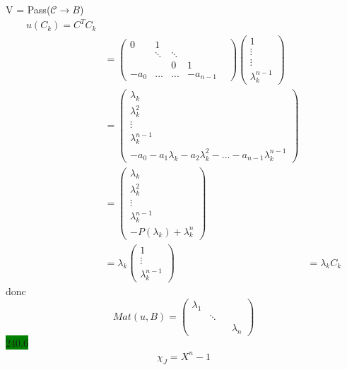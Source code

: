 \documentclass{article}
\begin{document}
V = Pass(\(\mathcal{C}\to B\))\begin{align*}
    u(C_k) = C^T C_k \\
    &= \begin{pmatrix}
        0 & 1 & & \\
        & \ddots & \ddots & & \\
        & & 0 & 1 \\
        -a_0&... & ...&-a_{n-1}
    \end{pmatrix}\begin{pmatrix}
        1 \\ \vdots \\ \vdots \\ \lambda_k^{n-1}
    \end{pmatrix}\\
    &= \begin{pmatrix}
        \lambda_k \\
        \lambda^2_k \\
        \vdots \\
        \lambda_k^{n-1}\\
        -a_0 - a_1\lambda_k - a_2\lambda_k^2-...-a_{n-1}\lambda_k^{n-1}
    \end{pmatrix}\\
    &= \begin{pmatrix}
        \lambda_k \\
        \lambda^2_k \\
        \vdots \\
        \lambda_k^{n-1}\\
        -P(\lambda_k) + \lambda_k^n
    \end{pmatrix}\\
    &= \lambda_k \begin{pmatrix}
        1 \\ \vdots \\ \lambda_k^{n-1}
    \end{pmatrix}
    &= \lambda_k C_k
\end{align*}
donc \begin{equation*}
    Mat(u,B) = \begin{pmatrix}
        \lambda_1 & & & \\
        & \ddots & & \\
        & & & \lambda_n
    \end{pmatrix}
\end{equation*}
\colorbox{green}{240.6}\\
\begin{align*}
    \chi_J = X^n -1
\end{align*}
\end{document}
